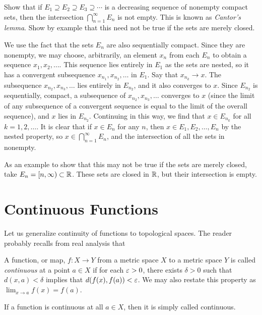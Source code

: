 \begin{exercise}
	Show that if $E_1 \supseteq E_2 \supseteq E_3 \supseteq \cdots$ is a decreasing sequence of nonempty compact sets, then the intersection $\bigcap_{n=1}^{\infty} E_n$ is not empty. This is known as \emph{Cantor's lemma}. Show by example that this need not be true if the sets are merely closed.
	
	\begin{sol}
		We use the fact that the sets $E_n$ are also sequentially compact. Since they are nonempty, we may choose, arbitrarily, an element $x_n$ from each $E_n$ to obtain a sequence $x_1,x_2,\dots.$ This sequence lies entirely in $E_1$ as the sets are nested, so it has a convergent subsequence $x_{n_1},x_{n_2},\dots$ in $E_1$. Say that $x_{n_k} \rightarrow x$. The subsequence $x_{n_2},x_{n_3},\dots$ lies entirely in $E_{n_2}$, and it also converges to $x$. Since $E_{n_2}$ is sequentially, compact, a subsequence of $x_{n_2},x_{n_3},\dots$ converges to $x$ (since the limit of any subsequence of a convergent sequence is equal to the limit of the overall sequence), and $x$ lies in $E_{n_2}$. Continuing in this way, we find that $x \in E_{n_k}$ for all $k=1,2,\dots$. It is clear that if $x \in E_n$ for any $n$, then $x \in E_1,E_2,\dots,E_n$ by the nested property, so $x \in \bigcap_{n=1}^{\infty}E_n$, and the intersection of all the sets in nonempty.
		
		As an example to show that this may not be true if the sets are merely closed, take $E_n=[n,\infty) \subset \mathbb R$. These sets are closed in $\mathbb R$, but their intersection is empty.
	\end{sol}
\end{exercise}

\section{Continuous Functions}
Let us generalize continuity of functions to topological spaces. The reader probably recalls from real analysis that

\begin{definition}
	 A function, or map, $f \colon X \rightarrow Y$ from a metric space $X$ to a metric space $Y$ is called \emph{continuous} at a point $a \in X$ if for each $\varepsilon>0$, there exists $\delta>0$ such that $d(x,a)<\delta$ implies that $d(f(x),f(a))<\varepsilon$. We may also restate this property as $\lim_{x \rightarrow a}f(x)=f(a)$.
	 
	 If a function is continuous at all $a \in X$, then it is simply called continuous.
\end{definition}

